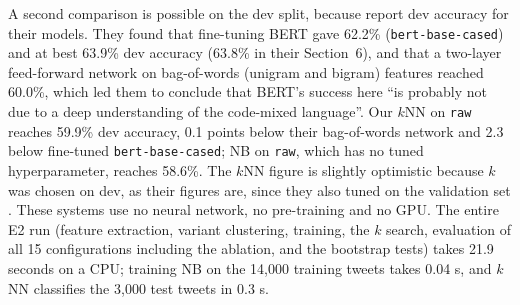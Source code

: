 A second comparison is possible on the dev split, because \citet{gopalan2020reed} report dev
accuracy for their models. They found that fine-tuning BERT gave 62.2\% (\texttt{bert-base-cased})
and at best 63.9\% dev accuracy (63.8\% in their Section~6), and that a two-layer feed-forward
network on bag-of-words (unigram and bigram) features reached 60.0\%, which led them to conclude
that BERT's success here ``is probably not due to a deep understanding of the code-mixed
language''. Our $k$NN on \texttt{raw} reaches 59.9\% dev accuracy, 0.1 points below their
bag-of-words network and 2.3 below fine-tuned \texttt{bert-base-cased}; NB on \texttt{raw}, which
has no tuned hyperparameter, reaches 58.6\%. The $k$NN figure is slightly optimistic because $k$
was chosen on dev, as their figures are, since they also tuned on the validation set
\citep{gopalan2020reed}. These systems use no neural network, no pre-training and no GPU. The
entire E2 run (feature extraction, variant clustering, training, the $k$ search, evaluation of all
15 configurations including the ablation, and the bootstrap tests) takes 21.9 seconds on a CPU; training NB on the 14{,}000
training tweets takes 0.04 s, and $k$NN classifies the 3{,}000 test tweets in 0.3 s.
